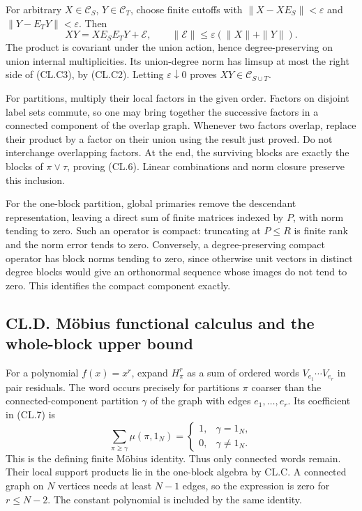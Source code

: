 For arbitrary \(X\in\mathcal C_S\), \(Y\in\mathcal C_T\), choose finite cutoffs with \(\|X-XE_S\|<\varepsilon\) and \(\|Y-E_TY\|<\varepsilon\). Then \[
XY=XE_SE_TY+\mathcal E,\qquad
\|\mathcal E\|\leq\varepsilon(\|X\|+\|Y\|).
\tag{CL.C3}
\] The product is covariant under the union action, hence degree-preserving on union internal multiplicities. Its union-degree norm has limsup at most the right side of (CL.C3), by (CL.C2). Letting \(\varepsilon\downarrow0\) proves \(XY\in\mathcal C_{S\cup T}\).

For partitions, multiply their local factors in the given order. Factors on disjoint label sets commute, so one may bring together the successive factors in a connected component of the overlap graph. Whenever two factors overlap, replace their product by a factor on their union using the result just proved. Do not interchange overlapping factors. At the end, the surviving blocks are exactly the blocks of \(\pi\vee\tau\), proving (CL.6). Linear combinations and norm closure preserve this inclusion.

For the one-block partition, global primaries remove the descendant representation, leaving a direct sum of finite matrices indexed by \(P\), with norm tending to zero. Such an operator is compact: truncating at \(P\leq R\) is finite rank and the norm error tends to zero. Conversely, a degree-preserving compact operator has block norms tending to zero, since otherwise unit vectors in distinct degree blocks would give an orthonormal sequence whose images do not tend to zero. This identifies the compact component exactly.

\hypertarget{cl.d.-muxf6bius-functional-calculus-and-the-whole-block-upper-bound}{%
\subsection{CL.D. Möbius functional calculus and the whole-block upper bound}\label{cl.d.-muxf6bius-functional-calculus-and-the-whole-block-upper-bound}}

For a polynomial \(f(x)=x^r\), expand \(H_\pi^r\) as a sum of ordered words \(V_{e_1}\cdots V_{e_r}\) in pair residuals. The word occurs precisely for partitions \(\pi\) coarser than the connected-component partition \(\gamma\) of the graph with edges \(e_1,\ldots,e_r\). Its coefficient in (CL.7) is \[
\sum_{\pi\geq\gamma}\mu(\pi,1_N)
=\begin{cases}1,&\gamma=1_N,\\0,&\gamma\ne1_N.\end{cases}
\tag{CL.D1}
\] This is the defining finite Möbius identity. Thus only connected words remain. Their local support products lie in the one-block algebra by CL.C. A connected graph on \(N\) vertices needs at least \(N-1\) edges, so the expression is zero for \(r\leq N-2\). The constant polynomial is included by the same identity.

